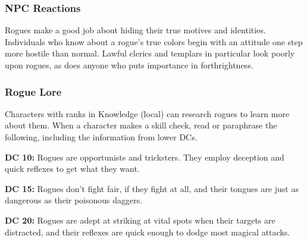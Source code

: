 \subsubsection{NPC Reactions}
Rogues make a good job about hiding their true motives and identities. Individuals who know about a rogue’s true colors begin with an attitude one step more hostile than normal. Lawful clerics and templars in particular look poorly upon rogues, as does anyone who puts importance in forthrightness.

\subsubsection{Rogue Lore}
Characters with ranks in Knowledge (local) can research rogues to learn more about them. When a character makes a skill check, read or paraphrase the following, including the information from lower DCs.

\textbf{DC 10:} Rogues are opportunists and tricksters. They employ deception and quick reflexes to get what they want.

\textbf{DC 15:} Rogues don’t fight fair, if they fight at all, and their tongues are just as dangerous as their poisonous daggers.

\textbf{DC 20:} Rogues are adept at striking at vital spots when their targets are distracted, and their reflexes are quick enough to dodge most magical attacks.